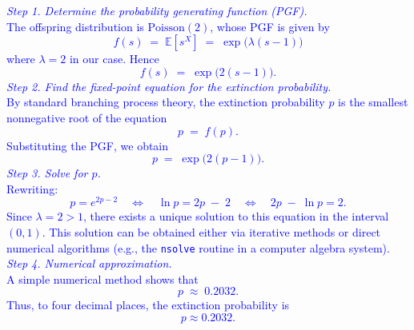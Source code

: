 \documentclass{article}
\begin{document}
\textcolor{blue}{
    \emph{Step 1. Determine the probability generating function (PGF).} \\
The offspring distribution is $\mathrm{Poisson}(2)$, whose PGF is given by
\[
f(s) \;=\; \mathbb{E}[s^X] \;=\; \exp\bigl(\lambda (s - 1)\bigr)
\]
where $\lambda = 2$ in our case. Hence
\[
f(s) \;=\; \exp\bigl(2(s - 1)\bigr).
\]
\noindent \emph{Step 2. Find the fixed-point equation for the extinction probability.} \\
By standard branching process theory, the extinction probability $p$ is the smallest nonnegative root of the equation
\[
p \;=\; f(p).
\]
Substituting the PGF, we obtain
\[
p \;=\; \exp\bigl(2(p - 1)\bigr).
\]
\noindent \emph{Step 3. Solve for $p$.} \\
Rewriting:
\[
p = e^{2p - 2}
\quad\Longleftrightarrow\quad
\ln p = 2p \;-\; 2
\quad\Longleftrightarrow\quad
2p \;-\; \ln p = 2.
\]
Since $\lambda = 2 > 1$, there exists a unique solution to this equation in the interval $(0,1)$. This solution can be obtained either via iterative methods or direct numerical algorithms (e.g., the \texttt{nsolve} routine in a computer algebra system).
\noindent \emph{Step 4. Numerical approximation.} \\
A simple numerical method shows that
\[
p \;\approx\; 0.2032.
\]
Thus, to four decimal places, the extinction probability is
\[
p \approx 0.2032.
\]
}
%
\end{document}
